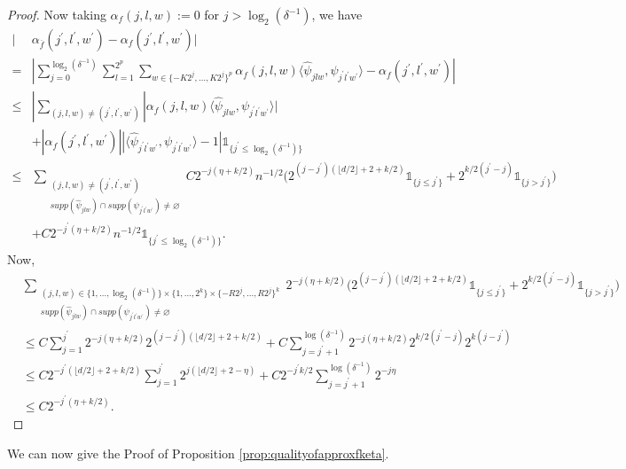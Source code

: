 \documentclass[10pt]{article}
\begin{document}
\begin{proof}
Now
taking $\alpha_f(j,l,w):=0$ for $j> \log_2(\delta^{-1})$, we have 
\begin{align*}
    |&\alpha_{\overline{f}}(j^{'},l^{'},w^{'})-\alpha_f(j^{'},l^{'},w^{'})| \\
    = & | \sum \limits_{j=0}^{\log_2(\delta^{-1})} \sum \limits_{l=1}^{2^p} \sum \limits_{w\in \{-K2^{j},...,K2^j\}^p} \alpha_f(j,l,w) \langle\hat{\psi}_{jlw},\psi_{j^{'}l^{'}w^{'}}\rangle-\alpha_f(j^{'},l^{'},w^{'})|\\
     \leq & | \sum \limits_{(j,l,w)\neq (j^{'},l^{'},w^{'})} |\alpha_f(j,l,w)\langle \hat{\psi}_{jlw},\psi_{j^{'}l^{'}w^{'}}\rangle|\\
    & +|\alpha_f(j^{'},l^{'},w^{'})||\langle \hat{\psi}_{j^{'}l^{'}w^{'}} , \psi_{j^{'}l^{'}w^{'}}\rangle-1|\mathds{1}_{\{j^{'}\leq\log_2(\delta^{-1})\}}\\
     \leq & \sum \limits_{\substack{(j,l,w)\neq (j^{'},l^{'},w^{'})\\ supp(\hat{\psi}_{jlw})\cap supp(\psi_{j^{'}l^{'}w^{'}})\neq \varnothing}} C2^{-j(\eta+k/2)}n^{-1/2}\Big(2^{(j-j^{'})(\lfloor d/2 \rfloor +2+k/2)}\mathds{1}_{\{j\leq j^{'}\}}+2^{k/2(j^{'}-j)}\mathds{1}_{\{j> j^{'}\}}\Big)\\
     & + C2^{-j^{'}(\eta+k/2)}n^{-1/2}\mathds{1}_{\{j^{'}\leq\log_2(\delta^{-1})\}}.
\end{align*}
Now,
\begin{align*}
      &\sum \limits_{\substack{(j,l,w)\in \{1,...,\log_2(\delta^{-1})\}\times \{1,...,2^k\}\times \{-R2^{j},...,R2^j\}^k\\ supp(\hat{\psi}_{jlw})\cap supp(\psi_{j^{'}l^{'}w^{'}})\neq \varnothing}} 2^{-j(\eta+k/2)}\Big(2^{(j-j^{'})(\lfloor d/2 \rfloor +2+k/2)}\mathds{1}_{\{j\leq j^{'}\}}+2^{k/2(j^{'}-j)}\mathds{1}_{\{j> j^{'}\}}\Big)\\
    &\leq C\sum_{j=1}^{j^{'}} 2^{-j(\eta+k/2)}2^{(j-j^{'})(\lfloor d/2 \rfloor +2+k/2)}+C\sum_{j=j^{'}+1}^{\log(\delta^{-1})} 2^{-j(\eta+k/2)}2^{k/2(j^{'}-j)}2^{k(j-j^{'})}
    \\
    &\leq C 2^{-j^{'}(\lfloor d/2 \rfloor +2+k/2)}\sum_{j=1}^{j^{'}} 2^{j(\lfloor d/2 \rfloor +2-\eta)}+C 2^{-j^{'}k/2}\sum_{j=j^{'}+1}^{\log(\delta^{-1})} 2^{-j\eta}
    \\
    &\leq C 2^{-j^{'}(\eta+k/2)}.
\end{align*}
\end{proof}

We can now give the Proof of Proposition \ref{prop:qualityofapproxfketa}.
\end{document}
